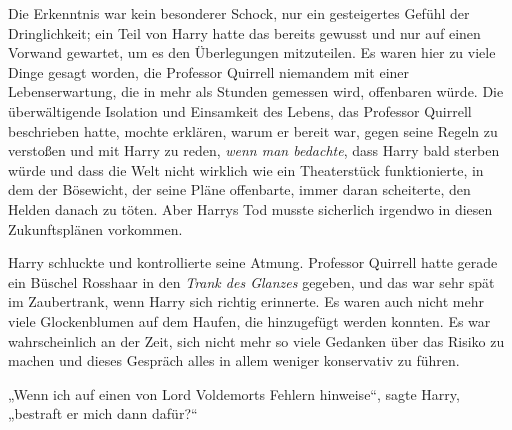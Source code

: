Die Erkenntnis war kein besonderer Schock, nur ein gesteigertes Gefühl der Dringlichkeit; ein Teil von Harry hatte das bereits gewusst und nur auf einen Vorwand gewartet, um es den Überlegungen mitzuteilen. Es waren hier zu viele Dinge gesagt worden, die Professor Quirrell niemandem mit einer Lebenserwartung, die in mehr als Stunden gemessen wird, offenbaren würde.
Die überwältigende Isolation und Einsamkeit des Lebens, das Professor Quirrell beschrieben hatte, mochte erklären, warum er bereit war, gegen seine Regeln zu verstoßen und mit Harry zu reden, \emph{wenn man bedachte}, dass Harry bald sterben würde und dass die Welt nicht wirklich wie ein Theaterstück funktionierte, in dem der Bösewicht, der seine Pläne offenbarte, immer daran scheiterte, den Helden danach zu töten. Aber Harrys Tod musste sicherlich irgendwo in diesen Zukunftsplänen vorkommen.

Harry schluckte und kontrollierte seine Atmung. Professor Quirrell hatte gerade ein Büschel Rosshaar in den \emph{Trank des Glanzes} gegeben, und das war sehr spät im Zaubertrank, wenn Harry sich richtig erinnerte.
Es waren auch nicht mehr viele Glockenblumen auf dem Haufen, die hinzugefügt werden konnten.
Es war wahrscheinlich an der Zeit, sich nicht mehr so viele Gedanken über das Risiko zu machen und dieses Gespräch alles in allem weniger konservativ zu führen.

„Wenn ich auf einen von Lord Voldemorts Fehlern hinweise“, sagte Harry, „bestraft er mich dann dafür?“

